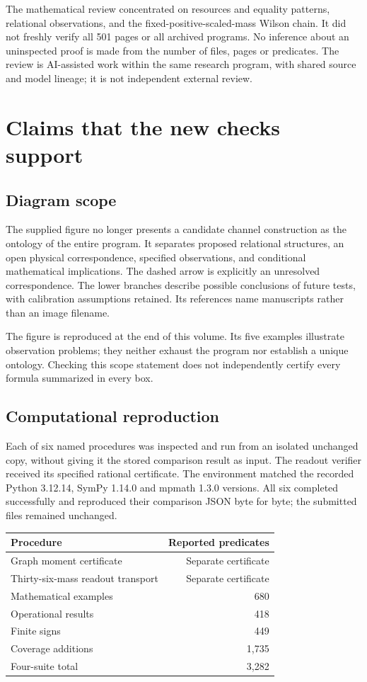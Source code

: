 \documentclass[11pt,a4paper]{article}
\begin{document}
The mathematical review concentrated on resources and equality patterns, relational observations, and the fixed-positive-scaled-mass Wilson chain. It did not freshly verify all 501 pages or all archived programs. No inference about an uninspected proof is made from the number of files, pages or predicates. The review is AI-assisted work within the same research program, with shared source and model lineage; it is not independent external review.

\section{Claims that the new checks support}

\subsection{Diagram scope}
The supplied figure no longer presents a candidate channel construction as the ontology of the entire program. It separates proposed relational structures, an open physical correspondence, specified observations, and conditional mathematical implications. The dashed arrow is explicitly an unresolved correspondence. The lower branches describe possible conclusions of future tests, with calibration assumptions retained. Its references name manuscripts rather than an image filename.

The figure is reproduced at the end of this volume. Its five examples illustrate observation problems; they neither exhaust the program nor establish a unique ontology. Checking this scope statement does not independently certify every formula summarized in every box.

\subsection{Computational reproduction}
Each of six named procedures was inspected and run from an isolated unchanged copy, without giving it the stored comparison result as input. The readout verifier received its specified rational certificate. The environment matched the recorded Python 3.12.14, SymPy 1.14.0 and mpmath 1.3.0 versions. All six completed successfully and reproduced their comparison JSON byte for byte; the submitted files remained unchanged.

\begin{center}\small
\begin{tabular}{p{84mm}r}\toprule
Procedure & Reported predicates\\\midrule
Graph moment certificate & Separate certificate\\
Thirty-six-mass readout transport & Separate certificate\\
Mathematical examples & 680\\
Operational results & 418\\
Finite signs & 449\\
Coverage additions & 1,735\\\midrule
Four-suite total & 3,282\\\bottomrule
\end{tabular}
\end{center}
\end{document}
